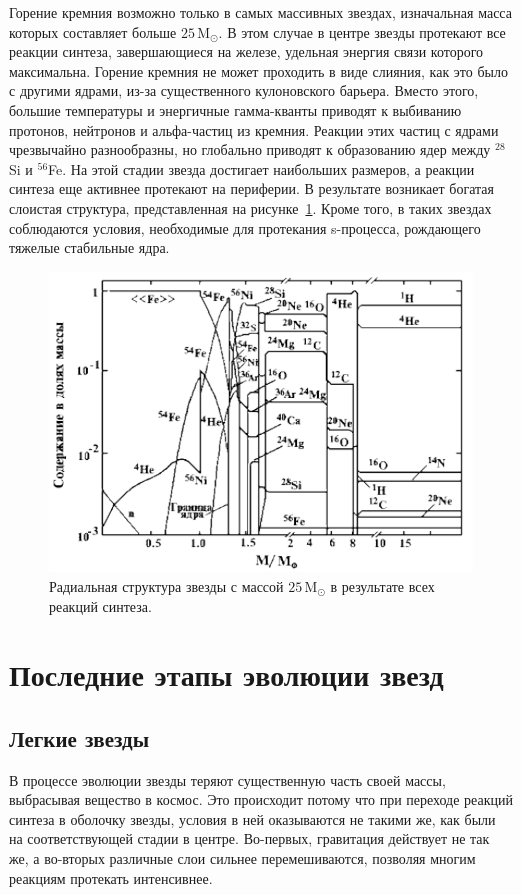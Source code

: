\documentclass[a4paper, 14pt]{extarticle}
\def\M{\mathrm{M}_\odot}
\begin{document}
Горение кремния возможно только в самых массивных звездах, изначальная 
масса которых составляет больше $25\,\M$. В этом случае в центре звезды 
протекают все реакции синтеза, завершающиеся на железе, удельная энергия 
связи которого максимальна. Горение кремния не может проходить в виде 
слияния, как это было с другими ядрами, из-за существенного кулоновского 
барьера. Вместо этого, большие температуры и энергичные гамма-кванты 
приводят к выбиванию протонов, нейтронов и альфа-частиц из кремния. 
Реакции этих частиц с ядрами чрезвычайно разнообразны, но глобально 
приводят к образованию ядер между $^{28}$Si и $^{56}$Fe. На этой стадии 
звезда достигает наибольших размеров, а реакции синтеза еще активнее 
протекают на периферии. В результате возникает богатая слоистая 
структура, представленная на рисунке~\ref{fig:layers.25M}. Кроме того, 
в таких звездах соблюдаются условия, необходимые для протекания 
s-процесса, рождающего тяжелые стабильные ядра.

\begin{figure}%
	\centering
	\includegraphics[width=.7\textwidth]{figures/nsf28.gif.pdf}
	\caption{Радиальная структура звезды с массой $25\,\M$ в результате 
	всех реакций синтеза.}
	\label{fig:layers.25M}
\end{figure}%


\section{Последние этапы эволюции звезд}

\subsection{Легкие звезды}

В процессе эволюции звезды теряют существенную часть своей массы, 
выбрасывая вещество в космос. Это происходит потому что при переходе 
реакций синтеза в оболочку звезды, условия в ней оказываются не такими 
же, как были на соответствующей стадии в центре. Во-первых, гравитация 
действует не так же, а во-вторых различные слои сильнее перемешиваются, 
позволяя многим реакциям протекать интенсивнее.
\end{document}
